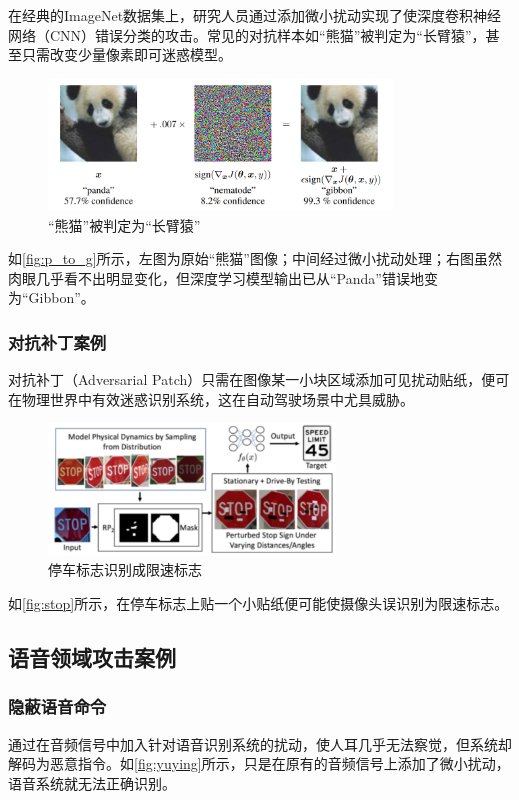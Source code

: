 \documentclass[main]{IEEEtran}
\begin{document}
在经典的ImageNet数据集上，研究人员通过添加微小扰动实现了使深度卷积神经网络（CNN）错误分类的攻击。常见的对抗样本如“熊猫”被判定为“长臂猿”，甚至只需改变少量像素即可迷惑模型\cite{goodfellow2014explaining}。

\begin{figure}[H]
    \centering
    \includegraphics[height=3.5cm]{fig/p_to_g}
    \caption{“熊猫”被判定为“长臂猿”}
    \label{fig:p_to_g}
\end{figure}

如\autoref{fig:p_to_g}所示，左图为原始“熊猫”图像；中间经过微小扰动处理；右图虽然肉眼几乎看不出明显变化，但深度学习模型输出已从“Panda”错误地变为“Gibbon”。

\subsubsection{对抗补丁案例}
对抗补丁（Adversarial Patch）只需在图像某一小块区域添加可见扰动贴纸，便可在物理世界中有效迷惑识别系统\cite{brown2017adversarial}，这在自动驾驶场景中尤具威胁。

\begin{figure}[H]
    \centering
    \includegraphics[height=3.5cm]{fig/stop}
    \caption{停车标志识别成限速标志}
    \label{fig:stop}
\end{figure}

如\autoref{fig:stop}所示，在停车标志上贴一个小贴纸便可能使摄像头误识别为限速标志\cite{eykholt2018robust}。



\subsection{语音领域攻击案例}
\subsubsection{隐蔽语音命令}
通过在音频信号中加入针对语音识别系统的扰动，使人耳几乎无法察觉，但系统却解码为恶意指令\cite{carlini2018audio}。如\autoref{fig:yuying}所示，只是在原有的音频信号上添加了微小扰动，语音系统就无法正确识别。
\end{document}
